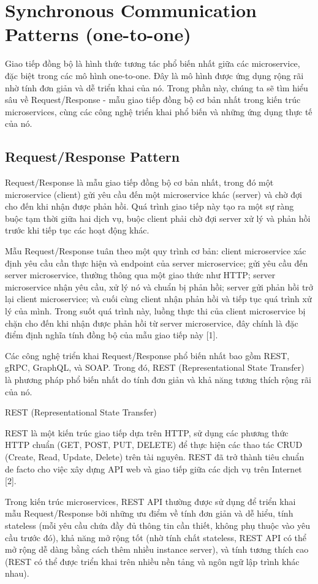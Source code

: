 \section{Synchronous Communication Patterns (one-to-one)}
Giao tiếp đồng bộ là hình thức tương tác phổ biến nhất giữa các microservice, đặc biệt trong các mô hình one-to-one. Đây là mô hình được ứng dụng rộng rãi nhờ tính đơn giản và dễ triển khai của nó. Trong phần này, chúng ta sẽ tìm hiểu sâu về Request/Response - mẫu giao tiếp đồng bộ cơ bản nhất trong kiến trúc microservices, cùng các công nghệ triển khai phổ biến và những ứng dụng thực tế của nó.

\subsection{Request/Response Pattern}
Request/Response là mẫu giao tiếp đồng bộ cơ bản nhất, trong đó một microservice (client) gửi yêu cầu đến một microservice khác (server) và chờ đợi cho đến khi nhận được phản hồi. Quá trình giao tiếp này tạo ra một sự ràng buộc tạm thời giữa hai dịch vụ, buộc client phải chờ đợi server xử lý và phản hồi trước khi tiếp tục các hoạt động khác.

Mẫu Request/Response tuân theo một quy trình cơ bản: client microservice xác định yêu cầu cần thực hiện và endpoint của server microservice; gửi yêu cầu đến server microservice, thường thông qua một giao thức như HTTP; server microservice nhận yêu cầu, xử lý nó và chuẩn bị phản hồi; server gửi phản hồi trở lại client microservice; và cuối cùng client nhận phản hồi và tiếp tục quá trình xử lý của mình. Trong suốt quá trình này, luồng thực thi của client microservice bị chặn cho đến khi nhận được phản hồi từ server microservice, đây chính là đặc điểm định nghĩa tính đồng bộ của mẫu giao tiếp này [1].

Các công nghệ triển khai Request/Response phổ biến nhất bao gồm REST, gRPC, GraphQL, và SOAP. Trong đó, REST (Representational State Transfer) là phương pháp phổ biến nhất do tính đơn giản và khả năng tương thích rộng rãi của nó.

REST (Representational State Transfer)

REST là một kiến trúc giao tiếp dựa trên HTTP, sử dụng các phương thức HTTP chuẩn (GET, POST, PUT, DELETE) để thực hiện các thao tác CRUD (Create, Read, Update, Delete) trên tài nguyên. REST đã trở thành tiêu chuẩn de facto cho việc xây dựng API web và giao tiếp giữa các dịch vụ trên Internet [2].

Trong kiến trúc microservices, REST API thường được sử dụng để triển khai mẫu Request/Response bởi những ưu điểm về tính đơn giản và dễ hiểu, tính stateless (mỗi yêu cầu chứa đầy đủ thông tin cần thiết, không phụ thuộc vào yêu cầu trước đó), khả năng mở rộng tốt (nhờ tính chất stateless, REST API có thể mở rộng dễ dàng bằng cách thêm nhiều instance server), và tính tương thích cao (REST có thể được triển khai trên nhiều nền tảng và ngôn ngữ lập trình khác nhau).

